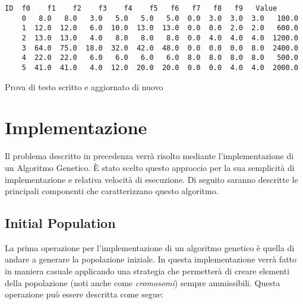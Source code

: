 \begin{lstlisting}[caption={Rappresentazione sotto forma tabellare dell'istanza precedente}]
    ID  f0    f1    f2    f3    f4    f5   f6   f7   f8   f9   Value
    0   8.0   8.0   3.0   5.0   5.0   5.0  0.0  3.0  3.0  3.0   100.0
    1  12.0  12.0   6.0  10.0  13.0  13.0  0.0  0.0  2.0  2.0   600.0
    2  13.0  13.0   4.0   8.0   8.0   8.0  0.0  4.0  4.0  4.0  1200.0
    3  64.0  75.0  18.0  32.0  42.0  48.0  0.0  0.0  0.0  8.0  2400.0
    4  22.0  22.0   6.0   6.0   6.0   6.0  8.0  8.0  8.0  8.0   500.0
    5  41.0  41.0   4.0  12.0  20.0  20.0  0.0  0.0  4.0  4.0  2000.0
\end{lstlisting}

Prova di testo scritto e aggiornato di nuovo

\section{Implementazione}

Il problema descritto in precedenza verrà risolto mediante l'implementazione
di un Algoritmo Genetico. È stato scelto questo approccio per la sua
semplicità di implementazione e relativa velocità di esecuzione. Di seguito
saranno descritte le principali componenti che caratterizzano questo algoritmo.

\subsection{Initial Population}
La prima operazione per l'implementazione di un algoritmo genetico è quella di
andare a generare la popolazione iniziale. In questa implementazione verrà
fatto in maniera casuale applicando una strategia che permetterà di creare
elementi della popolazione (noti anche come \textit{cromosomi}) sempre ammissibili.
Questa operazione può essere descritta come segue:

